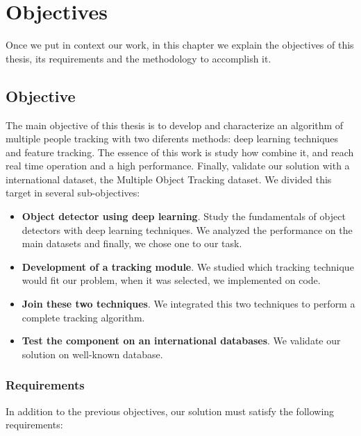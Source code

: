 \chapter{Objectives}\label{cap.objetctives}

Once we put in context our work, in this chapter we explain the objectives of this thesis, its requirements and the methodology to accomplish it.


\section{Objective}

The main objective of this thesis is to develop and characterize an algorithm of multiple people tracking with two diferents methods: deep learning techniques and feature tracking. The essence of this work is study how combine it, and reach real time operation and a high performance. Finally, validate our solution with a international dataset, the Multiple Object Tracking dataset. We divided this target in several sub-objectives:

\begin{itemize}


\item \textbf{Object detector using deep learning}. Study the fundamentals of object detectors with deep learning techniques. We analyzed the performance on the main datasets and finally, we chose one to our task. 

\item \textbf{Development of a tracking module}. We studied which tracking technique would fit our problem, when it was selected, we implemented on code.

\item \textbf{Join these two techniques}. We integrated this two techniques to perform a complete tracking algorithm.

\item \textbf{Test the component on an international databases}. We validate our solution on well-known database. 


\end{itemize}

\subsection{Requirements}

In addition to the previous objectives, our solution must satisfy the following requirements:

